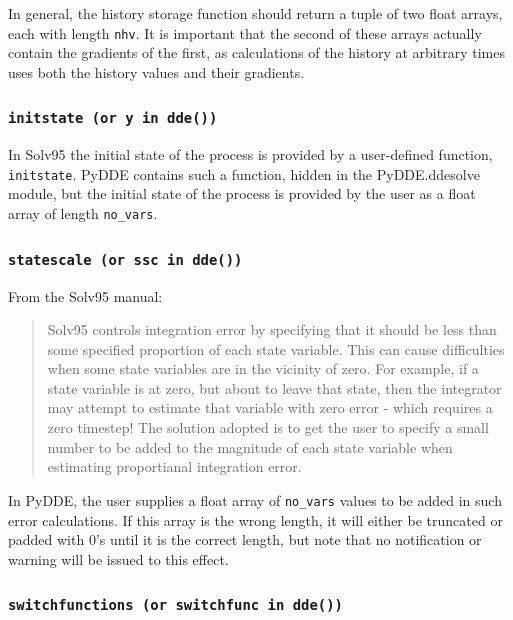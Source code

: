 \documentclass[10pt,a4paper] {article}
\begin{document}
In general, the history storage function should return a tuple of two float arrays, each with length \verb+nhv+.  It is important that the second of these arrays actually contain the gradients of the first, as calculations of the history at arbitrary times uses both the history values and their gradients.

\subsubsection{\tt{initstate} \textrm{(or} {\tt y}\textrm{ in} {\tt dde()}\textrm{)}}

In Solv95 the initial state of the process is provided by a user-defined function, \verb+initstate+.  PyDDE contains such a function, hidden in the PyDDE.ddesolve module, but the initial state of the process is provided by the user as a float array of length \verb+no_vars+.

\subsubsection{\tt{statescale} \textrm{(or} {\tt ssc}\textrm{ in} {\tt dde()}\textrm{)}}

From the Solv95 manual:
\begin{quotation}
Solv95 controls integration error by specifying that it should be less than some specified %
proportion of each state variable.  This can cause difficulties when some state variables are in %
the vicinity of zero.  For example, if a state variable is at zero, but about to leave that state, %
then the integrator may attempt to estimate that variable with zero error - which requires a zero %
timestep!  The solution adopted is to get the user to specify a small number to be added to the %
magnitude of each state variable when estimating proportianal integration error.
\end{quotation}
In PyDDE, the user supplies a float array of \verb+no_vars+ values to be added in such error calculations.  If this array is the wrong length, it will either be truncated or padded with $0$'s until it is the correct length, but note that no notification or warning will be issued to this effect.

\subsubsection{\tt{switchfunctions} \textrm{(or} {\tt switchfunc}\textrm{ in} {\tt dde()}\textrm{)}}
\end{document}

